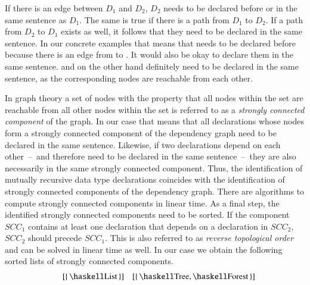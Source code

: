 If there is an edge between $D_1$ and $D_2$, $D_2$ needs to be declared before or in the same sentence as $D_1$.
The same is true if there is a path from $D_1$ to $D_2$.
If a path from $D_2$ to $D_1$ exists as well, it follows that they need to be declared in the same sentence.
In our concrete examples that means that  needs to be declared before  because there is an edge from  to .
It would also be okay to declare them in the same sentence.
 and  on the other hand definitely need to be declared in the same sentence, as the corresponding nodes are reachable from each other.

In graph theory a set of nodes with the property that all nodes within the set are reachable from all other nodes within the set is referred to as a \textit{strongly connected component} of the graph.
In our case that means that all declarations whose nodes form a strongly connected component of the dependency graph need to be declared in the same sentence.
Likewise, if two declarations depend on each other~--~and therefore need to be declared in the same sentence~--~they are also necessarily in the same strongly connected component.
Thus, the identification of mutually recursive data type declarations coincides with the identification of strongly connected components of the dependency graph.
There are algorithms to compute strongly connected components in linear time.
As a final step, the identified strongly connected components need to be sorted.
If the component $SCC_1$ contains at least one declaration that depends on a declaration in $SCC_2$, $SCC_2$ should precede $SCC_1$.
This is also referred to as \textit{reverse topological order} and can be solved in linear time as well.
In our case we obtain the following sorted lists of strongly connected components.
\begin{align*}
  [\{\, \haskellM{B} \,\}, \{\, \haskellM{A} \,\}]
  && [\{\, \haskellM{List} \,\}]
  && [\{\, \haskellM{Tree}, \haskellM{Forest} \,\}]
\end{align*}

